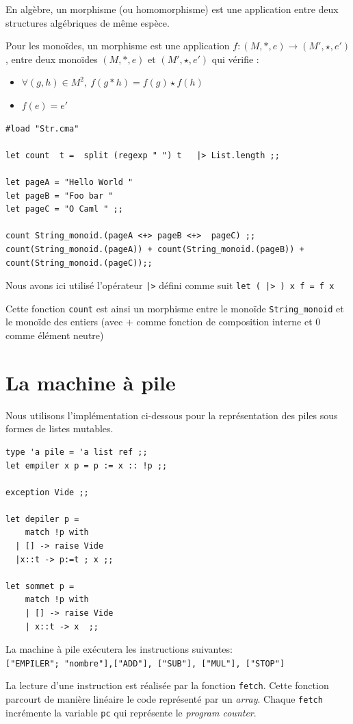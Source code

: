 \documentclass[11pt]{book}
\begin{document}
En algèbre, un morphisme (ou homomorphisme) est une application entre deux structures algébriques
de même espèce.

Pour les  monoïdes, un morphisme est une application 
$f:(M,*,e)\longrightarrow (M',\star ,e')$ , entre deux monoïdes $ (M,*,e)$ et 
$(M',\star , e')$ qui vérifie :
\begin{itemize}
	\item $\forall (g,h)\in M^{2},~f(g*h)=f(g)\star f(h)$
	\item $f(e)=e'$
\end{itemize}
\begin{Verbatim}
#load "Str.cma"

let count  t =  split (regexp " ") t   |> List.length ;;

let pageA = "Hello World "
let pageB = "Foo bar "
let pageC = "O Caml " ;;

count String_monoid.(pageA <+> pageB <+>  pageC) ;;
count(String_monoid.(pageA)) + count(String_monoid.(pageB)) + count(String_monoid.(pageC));;
\end{Verbatim}
Nous avons ici utilisé l'opérateur \verb+|>+ défini comme suit \verb+let ( |> ) x f = f x+

Cette fonction \verb+count+ est ainsi un morphisme entre le monoïde \verb+String_monoid+ et 
le monoïde des entiers (avec $+$ comme fonction de composition interne et $0$
comme élément neutre)

\section{La machine à pile}
Nous utilisons l'implémentation ci-dessous pour la représentation des piles sous
formes de listes mutables.
\begin{Verbatim}
type 'a pile = 'a list ref ;;
let empiler x p = p := x :: !p ;;

exception Vide ;;

let depiler p =  
	match !p with
  | [] -> raise Vide
  |x::t -> p:=t ; x ;;

let sommet p =
	match !p with
	| [] -> raise Vide
	| x::t -> x  ;;
\end{Verbatim}

La machine à pile exécutera les instructions suivantes:\\
\verb+["EMPILER"; "nombre"],["ADD"], ["SUB"], ["MUL"], ["STOP"]+

La lecture d'une instruction est réalisée par la fonction \texttt{fetch}. Cette
fonction parcourt de manière linéaire le code représenté par un \textit{array}.
Chaque \texttt{fetch} incrémente la variable \verb+pc+ qui représente le
\textit{program counter}.
\end{document}
